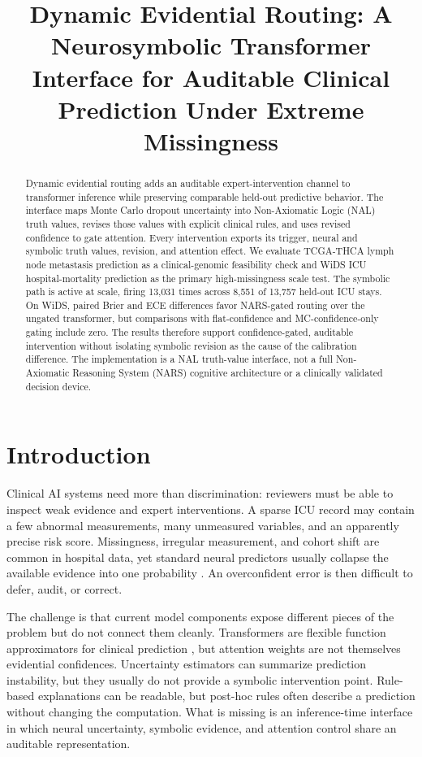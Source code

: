 \documentclass[final]{nesy2026}
\title[Dynamic Evidential Routing]{Dynamic Evidential Routing: A Neurosymbolic Transformer Interface for Auditable Clinical Prediction Under Extreme Missingness}
\begin{document}
\maketitle

\begin{abstract}
Dynamic evidential routing adds an auditable expert-intervention channel to transformer inference while preserving comparable held-out predictive behavior. The interface maps Monte Carlo dropout uncertainty into Non-Axiomatic Logic (NAL) truth values, revises those values with explicit clinical rules, and uses revised confidence to gate attention. Every intervention exports its trigger, neural and symbolic truth values, revision, and attention effect. We evaluate TCGA-THCA lymph node metastasis prediction as a clinical-genomic feasibility check and WiDS ICU hospital-mortality prediction as the primary high-missingness scale test. The symbolic path is active at scale, firing 13,031 times across 8,551 of 13,757 held-out ICU stays. On WiDS, paired Brier and ECE differences favor NARS-gated routing over the ungated transformer, but comparisons with flat-confidence and MC-confidence-only gating include zero. The results therefore support confidence-gated, auditable intervention without isolating symbolic revision as the cause of the calibration difference. The implementation is a NAL truth-value interface, not a full Non-Axiomatic Reasoning System (NARS) cognitive architecture or a clinically validated decision device.
\end{abstract}

\section{Introduction}
\label{sec:intro}

Clinical AI systems need more than discrimination: reviewers must be able to inspect weak evidence and expert interventions. A sparse ICU record may contain a few abnormal measurements, many unmeasured variables, and an apparently precise risk score. Missingness, irregular measurement, and cohort shift are common in hospital data, yet standard neural predictors usually collapse the available evidence into one probability \citep{ma2019,ovadia2019,ghassemi2021}. An overconfident error is then difficult to defer, audit, or correct.

The challenge is that current model components expose different pieces of the problem but do not connect them cleanly. Transformers are flexible function approximators for clinical prediction \citep{rasmy2021,azizi2021,li2019}, but attention weights are not themselves evidential confidences. Uncertainty estimators can summarize prediction instability, but they usually do not provide a symbolic intervention point. Rule-based explanations can be readable, but post-hoc rules often describe a prediction without changing the computation. What is missing is an inference-time interface in which neural uncertainty, symbolic evidence, and attention control share an auditable representation.
\end{document}
